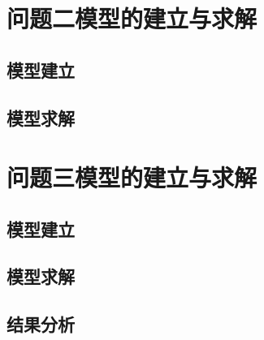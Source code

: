 \documentclass[withoutpreface,bwprint]{cumcmthesis}
\begin{document}
\fi

\section{问题二模型的建立与求解}

\subsection {模型建立}

\subsection {模型求解}




\section{问题三模型的建立与求解}


\subsection {模型建立}


\subsection {模型求解}



\subsection {结果分析}
\end{document}
